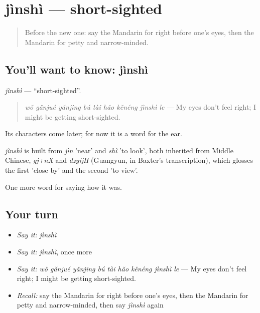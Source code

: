 \section[jìnshì]{jìnshì — short-sighted}

\label{lesson:ZH-C471-jinshi}



\begin{quote}
Before the new one: say the Mandarin for right before one's eyes, then the Mandarin for petty and narrow-minded.
\end{quote}

\subsection*{You'll want to know: jìnshì}
\emph{jìnshì} — \textquotedblleft{}short-sighted\textquotedblright{}.

\begin{quote}
\emph{wǒ gǎnjué yǎnjing bú tài hǎo kěnéng jìnshì le} — My eyes don't feel right; I might be getting short-sighted.
\end{quote}

Its characters come later; for now it is a word for the ear.

\begin{cousinweb}
\emph{jìnshì} is built from \emph{jìn} 'near' and \emph{shì} 'to look', both inherited from Middle Chinese, \emph{gj+nX} and \emph{dzyijH} (Guangyun, in Baxter's transcription), which glosses the first 'close by' and the second 'to view'.
\end{cousinweb}

\begin{grammarlens}[title={What you've built}]
One more word for saying how it was.
\end{grammarlens}

\subsection*{Your turn}
\begin{itemize}
\raggedright
  \item \emph{Say it:} \emph{jìnshì}
  \item \emph{Say it:} \emph{jìnshì}, once more
  \item \emph{Say it:} \emph{wǒ gǎnjué yǎnjing bú tài hǎo kěnéng jìnshì le} — My eyes don't feel right; I might be getting short-sighted.
  \item \emph{Recall:} say the Mandarin for right before one's eyes, then the Mandarin for petty and narrow-minded, then say \emph{jìnshì} again
\end{itemize}

